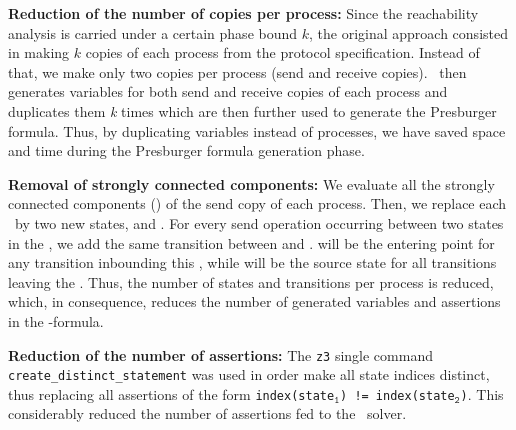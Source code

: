 \begin{description}
\item{\textbf{Reduction of the number of copies per process:}}
Since the reachability analysis is carried under a certain phase bound $k$, the original approach consisted in making $k$ copies of each process from the protocol specification.
Instead of that, we make only two copies per process (send and receive copies).
\MPass\ then generates variables for both send and receive copies of each process and duplicates them \emph{k} times which are then further used to generate the Presburger formula.
%
Thus, by duplicating variables instead of processes, we have saved space and time during the Presburger formula generation phase.
%
\item{\textbf{Removal of strongly connected components:}}
We evaluate all the strongly connected components (\Scc) of the send copy of each process. 
Then, we replace each \Scc\ by two new states, \sccin and \sccout.
For every send operation occurring between two states in the \Scc,
we add the same transition between \sccin and \sccout.
\sccin will be the entering point for any transition inbounding this \Scc,
while \sccout will be the source state for all transitions leaving the \Scc.
%
Thus, the number of states and transitions per process is reduced, which, in consequence, reduces the number of generated variables and assertions in the \Smt-formula.
\item{\textbf{Reduction of the number of assertions:}} The \texttt{z3} single command \texttt{create\_distinct\_statement} was used in order make all state indices distinct,
thus replacing all assertions of the form \texttt{index(state$_{\texttt{1}}$) != index(state$_{\texttt{2}}$)}.
This considerably reduced the number of assertions fed to the \Smt\ solver.
\end{description}
